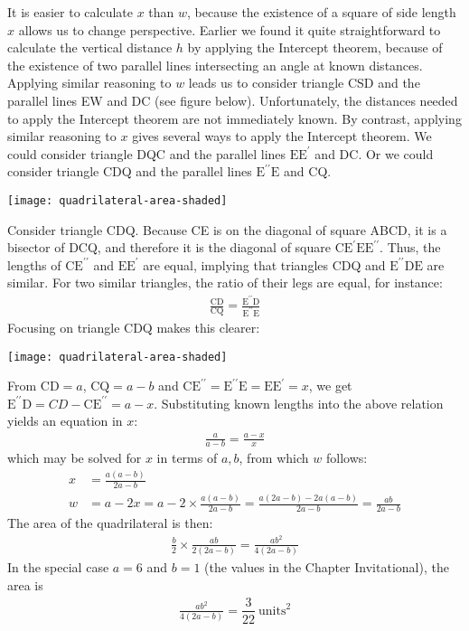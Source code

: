 \documentclass[12pt]{article}
\begin{document}
\begin{answer}
It is easier to calculate $x$ than $w$, because the existence of a square of side length $x$ allows us to change perspective. Earlier we found it quite straightforward to calculate the vertical distance $h$ by applying the Intercept theorem, because of the existence of two parallel lines intersecting an angle at known distances. Applying similar reasoning to $w$ leads us to consider triangle CSD and the parallel lines EW and DC (see figure below). Unfortunately, the distances needed to apply the Intercept theorem are not immediately known. By contrast, applying similar reasoning to $x$ gives several ways to apply the Intercept theorem. We could consider triangle DQC and the parallel lines $\text{E}\text{E}^{\prime}$ and DC. Or we could consider triangle CDQ and the parallel lines $\text{E}^{\prime\prime}\text{E}$ and CQ. 

\begin{center}
\texttt{[image: quadrilateral-area-shaded]}
\end{center} 


Consider triangle CDQ. Because CE is on the diagonal of square ABCD, it is a bisector of DCQ, and therefore it is the diagonal of square $\text{C}\text{E}^{\prime}\text{E}\text{E}^{\prime\prime}$. Thus, the lengths of $\text{C}\text{E}^{\prime\prime}$ and $\text{E}\text{E}^{\prime}$ are equal, implying that triangles CDQ and  $\text{E}^{\prime\prime}\text{D}\text{E}$ are similar. For two similar triangles, the ratio of their legs are equal, for instance:
\begin{align*}
\frac{\text{C}\text{D}}{\text{C}\text{Q}} 
= \frac{\text{E}^{\prime\prime}\text{D}}{\text{E}^{\prime\prime}\text{E}}  
\end{align*}
Focusing on triangle CDQ makes this clearer:
\begin{center}
\texttt{[image: quadrilateral-area-shaded]}
\end{center}
From $\text{CD}=a$, $\text{CQ}=a-b$ and   $\text{C}\text{E}^{\prime\prime}=\text{E}^{\prime\prime}\text{E}=\text{E}\text{E}^{\prime}=x$, we get $\text{E}^{\prime\prime}\text{D}=CD-\text{C}\text{E}^{\prime\prime}=a-x$. Substituting known lengths into the above relation yields an equation in $x$:
\begin{align*}
\frac{a}{a-b} = \frac{a-x}{x} 
\end{align*}
which may be solved for $x$ in terms of $a,b$, from which $w$ follows: 
\begin{align*}
x & = \frac{a(a-b)}{2a-b} \\
w & = a - 2x 
    = a - 2 \times \frac{a(a-b)}{2a-b} 
    = \frac{a(2a-b)-2a(a-b)}{2a-b}
    = \frac{ab}{2a-b}
\end{align*}
The area of the quadrilateral is then:
\begin{align*}
\frac{b}{2} \times \frac{ab}{2(2a-b)}
  = \frac{ab^2}{4(2a-b)}
\end{align*}
In the special case $a=6$ and $b=1$ (the values in the Chapter Invitational), the area is
\begin{align*}
\frac{ab^2}{4(2a-b)}
 = \dfrac{3}{22}~\text{units}^{2}
\end{align*}


\end{answer}
\end{document}
